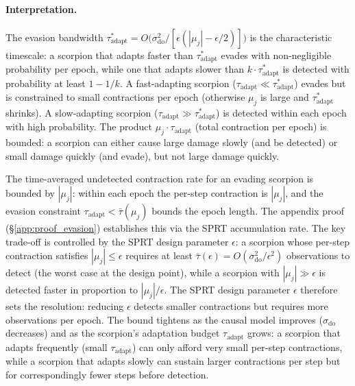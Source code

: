 \paragraph{Interpretation.} The evasion bandwidth
$\tau_{\mathrm{adapt}}^* = O\bigl(\sigma_{\mathrm{do}}^2 /
[\epsilon(|\mu_j| - \epsilon/2)]\bigr)$ is the
characteristic timescale: a scorpion that adapts faster than
$\tau_{\mathrm{adapt}}^*$ evades with non-negligible probability per
epoch, while one that adapts slower than $k \cdot
\tau_{\mathrm{adapt}}^*$ is detected with probability at least
$1 - 1/k$.
A fast-adapting scorpion ($\tau_{\mathrm{adapt}} \ll
\tau_{\mathrm{adapt}}^*$) evades but is constrained to small contractions
per epoch (otherwise $\mu_j$ is large and $\tau_{\mathrm{adapt}}^*$ shrinks).
A slow-adapting scorpion ($\tau_{\mathrm{adapt}} \gg
\tau_{\mathrm{adapt}}^*$) is detected within each epoch with high
probability. The product $\mu_j \cdot \tau_{\mathrm{adapt}}$ (total
contraction per epoch) is bounded: a scorpion can either cause large
damage slowly (and be detected) or small damage quickly (and evade),
but not large damage quickly.

The time-averaged undetected contraction rate for an evading scorpion
is bounded by $|\mu_j|$: within each epoch the per-step contraction
is $|\mu_j|$, and the evasion constraint
$\tau_{\mathrm{adapt}} < \bar{\tau}(\mu_j)$ bounds the epoch length.
The appendix proof (§\ref{app:proof_evasion}) establishes this via
the SPRT accumulation rate. The key trade-off is controlled by the
SPRT design parameter $\epsilon$: a scorpion whose per-step
contraction satisfies $|\mu_j| \leq \epsilon$ requires at least
$\bar{\tau}(\epsilon) = O(\sigma_{\mathrm{do}}^2 / \epsilon^2)$
observations to detect (the worst case at the design point), while
a scorpion with $|\mu_j| \gg \epsilon$ is detected faster in
proportion to $|\mu_j| / \epsilon$. The SPRT design parameter
$\epsilon$ therefore sets the resolution: reducing $\epsilon$ detects
smaller contractions but requires more observations per epoch.
The bound tightens as the causal model improves ($\sigma_{\mathrm{do}}$
decreases) and as the scorpion's adaptation budget
$\tau_{\mathrm{adapt}}$ grows: a scorpion that adapts frequently
(small $\tau_{\mathrm{adapt}}$) can only afford very small per-step
contractions, while a scorpion that adapts slowly can sustain larger
contractions per step but for correspondingly fewer steps before
detection.
